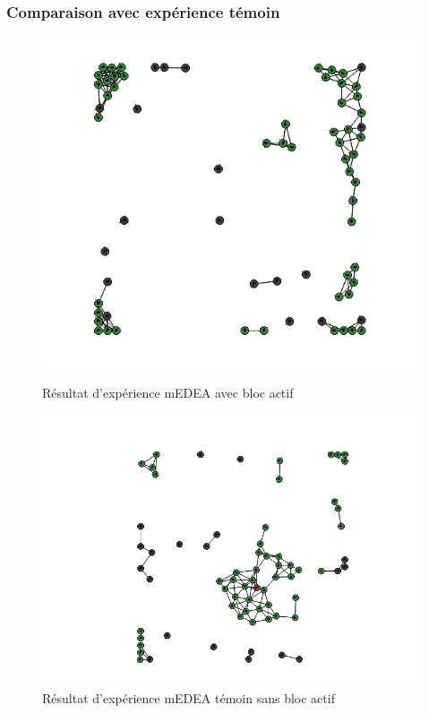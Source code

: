 \documentclass[a4paper]{article}
\begin{document}
\subsubsection{Comparaison avec expérience témoin}
\begin{figure}[h]
	\begin{minipage}[c]{.46\linewidth}
		\centering
		\includegraphics[scale=0.29]{../../script_results/expe_temoin.png}
		\caption{Résultat d'expérience mEDEA avec bloc actif }
	\end{minipage}
	\hfill%
	\begin{minipage}[c]{.46\linewidth}
		\centering
		\includegraphics[width=1.1\linewidth]{../../script_results/expe_normale.png}
		\caption{Résultat d'expérience mEDEA témoin sans bloc actif }
	\end{minipage}
\end{figure}
\end{document}
